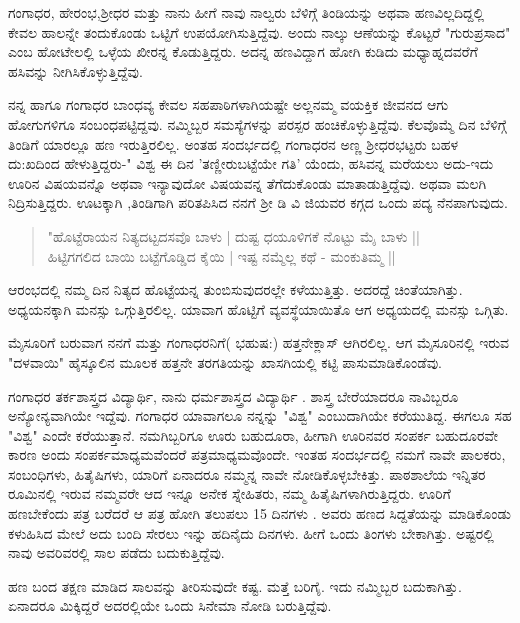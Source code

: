 ಗಂಗಾಧರ, ಹೇರಂಭ,ಶ್ರೀಧರ ಮತ್ತು ನಾನು ಹೀಗೆ ನಾವು ನಾಲ್ವರು ಬೆಳಿಗ್ಗೆ ತಿಂಡಿಯನ್ನು ಅಥವಾ ಹಣವಿಲ್ಲದಿದ್ದಲ್ಲಿ ಕೇವಲ   ಹಾಲನ್ನೇ ತಂದುಕೊಂಡು ಒಟ್ಟಿಗೆ ಉಪಯೋಗಿಸುತ್ತಿದ್ದೆವು. ಅಂದು ನಾಲ್ಕು ಆಣೆಯನ್ನು ಕೊಟ್ಟರೆ "ಗುರುಪ್ರಸಾದ" ಎಂಬ ಹೋಟೇಲಲ್ಲಿ  ಒಳ್ಳೆಯ ಖೀರನ್ನ ಕೊಡುತ್ತಿದ್ದರು. ಅದನ್ನ ಹಣವಿದ್ದಾಗ ಹೋಗಿ ಕುಡಿದು ಮಧ್ಯಾಹ್ನದವರೆಗೆ ಹಸಿವನ್ನು ನೀಗಿಸಿಕೊಳ್ಳುತ್ತಿದ್ದೆವು. 

ನನ್ನ ಹಾಗೂ ಗಂಗಾಧರ ಬಾಂಧವ್ಯ ಕೇವಲ ಸಹಪಾಠಿಗಳಾಗಿಯಷ್ಟೇ ಅಲ್ಲನಮ್ಮ ವಯಕ್ತಿಕ ಜೀವನದ ಆಗು ಹೋಗುಗಳಿಗೂ  ಸಂಬಂಧಪಟ್ಟಿದ್ದವು. ನಮ್ಮಿಬ್ಬರ ಸಮಸ್ಯೆಗಳನ್ನು ಪರಸ್ಪರ ಹಂಚಿಕೊಳ್ಳುತ್ತಿದ್ದೆವು. ಕೆಲವೊಮ್ಮೆ ದಿನ ಬೆಳಿಗ್ಗೆ ತಿಂಡಿಗೆ ಯಾರಲ್ಲೂ ಹಣ ಇರುತ್ತಿರಲಿಲ್ಲ. ಅಂತಹ ಸಂದರ್ಭದಲ್ಲಿ ಗಂಗಾಧರನ ಅಣ್ಣ ಶ್ರೀಧರಭಟ್ಟರು ಬಹಳ ದು:ಖದಿಂದ ಹೇಳುತ್ತಿದ್ದರು-" ವಿಶ್ವ ಈ ದಿನ 'ತಣ್ಣೀರುಬಟ್ಟೆಯೇ ಗತಿ' ಯೆಂದು, ಹಸಿವನ್ನ ಮರೆಯಲು ಅದು-ಇದು ಊರಿನ ವಿಷಯವನ್ನೊ ಅಥವಾ ಇನ್ಯಾವುದೋ ವಿಷಯವನ್ನ ತೆಗೆದುಕೊಂಡು ಮಾತಾಡುತ್ತಿದ್ದೆವು. ಅಥವಾ ಮಲಗಿ ನಿದ್ರಿಸುತ್ತಿದ್ದರು. ಊಟಕ್ಕಾಗಿ ,ತಿಂಡಿಗಾಗಿ ಪರಿತಪಿಸಿದ ನನಗೆ ಶ್ರೀ ಡಿ ವಿ ಜಿಯವರ ಕಗ್ಗದ ಒಂದು ಪದ್ಯ ನೆನಪಾಗುವುದು. 

\begin{verse}
"ಹೊಟ್ಟೆರಾಯನ ನಿತ್ಯದಟ್ಟದಸವೊ ಬಾಳು | ದುಷ್ಟ ಧಯೂಳಿಗಕೆ ನೊಟ್ಟು ಮೈ ಬಾಳು || \\
ಹಿಟ್ಟಿಗಗಲಿದ ಬಾಯಿ ಬಟ್ಟೆಗೊಡ್ಡಿದ ಕೈಯಿ | ಇಷ್ಟ ನಮ್ಮೆಲ್ಲ  ಕಥೆ - ಮಂಕುತಿಮ್ಮ  || 
\end{verse}

ಆರಂಭದಲ್ಲಿ ನಮ್ಮ ದಿನ ನಿತ್ಯದ ಹೊಟ್ಟೆಯನ್ನ ತುಂಬಿಸುವುದರಲ್ಲೇ ಕಳೆಯುತ್ತಿತ್ತು. ಅದರದ್ದೆ ಚಿಂತೆಯಾಗಿತ್ತು.  ಅಧ್ಯಯನಕ್ಕಾಗಿ ಮನಸ್ಸು ಒಗ್ಗುತ್ತಿರಲಿಲ್ಲ. ಯಾವಾಗ ಹೊಟ್ಟಿಗೆ  ವ್ಯವಸ್ಥೆಯಾಯಿತೊ ಆಗ ಅಧ್ಯಯದಲ್ಲಿ ಮನಸ್ಸು  ಒಗ್ಗಿತು. 

ಮೈಸೂರಿಗೆ ಬರುವಾಗ ನನಗೆ ಮತ್ತು ಗಂಗಾಧರನಿಗೆ( ಭಹುಷ:) ಹತ್ತನೇಕ್ಲಾಸ್ ಆಗಿರಲಿಲ್ಲ. ಆಗ ಮೈಸೂರಿನಲ್ಲಿ ಇರುವ "ದಳವಾಯಿ" ಹೈಸ್ಕೂಲಿನ ಮೂಲಕ ಹತ್ತನೇ ತರಗತಿಯನ್ನು ಖಾಸಗಿಯಲ್ಲಿ ಕಟ್ಟಿ ಪಾಸುಮಾಡಿಕೊಂಡೆವು. 

ಗಂಗಾಧರ ತರ್ಕಶಾಸ್ತ್ರದ ವಿದ್ಯಾರ್ಥಿ, ನಾನು ಧರ್ಮಶಾಸ್ತ್ರದ ವಿದ್ಯಾರ್ಥಿ . ಶಾಸ್ತ್ರ ಬೇರೆಯಾದರೂ ನಾವಿಬ್ಬರೂ ಅನ್ಯೋನ್ಯವಾಗಿಯೇ ಇದ್ದೆವು. ಗಂಗಾಧರ ಯಾವಾಗಲೂ ನನ್ನನ್ನು "ವಿಶ್ವ" ಎಂಬುದಾಗಿಯೇ ಕರೆಯುತಿದ್ದ. ಈಗಲೂ ಸಹ "ವಿಶ್ವ" ಎಂದೇ ಕರೆಯುತ್ತಾನೆ. ನಮಗಿಬ್ಬರಿಗೂ ಊರು ಬಹುದೂರಾ, ಹೀಗಾಗಿ ಊರಿನವರ ಸಂಪರ್ಕ ಬಹುದೂರವೇ ಕಾರಣ ಅಂದು  ಸಂಪರ್ಕಮಾಧ್ಯಮವೆಂದರೆ ಪತ್ರಮಾಧ್ಯಮವೊಂದೇ. ಇಂತಹ ಸಂದರ್ಭದಲ್ಲಿ ನಮಗೆ ನಾವೇ ಪಾಲಕರು, ಸಂಬಂಧಿಗಳು, ಹಿತೈಷಿಗಳು, ಯಾರಿಗೆ ಏನಾದರೂ ನಮ್ಮನ್ನ  ನಾವೇ ನೋಡಿಕೊಳ್ಳಬೇಕಿತ್ತು.  ಪಾಠಶಾಲೆಯ ಇನ್ನಿತರ  ರೂಮಿನಲ್ಲಿ  ಇರುವ ನಮ್ಮವರೇ ಆದ ಇನ್ನೂ ಅನೇಕ ಸ್ನೇಹಿತರು, ನಮ್ಮ ಹಿತೈಷಿಗಳಾಗಿರುತ್ತಿದ್ದರು.  ಊರಿಗೆ ಹಣಬೇಕೆಂದು ಪತ್ರ ಬರೆದರೆ ಆ ಪತ್ರ ಹೋಗಿ ತಲುಪಲು 15 ದಿನಗಳು . ಅವರು ಹಣದ ಸಿದ್ದತೆಯನ್ನು ಮಾಡಿಕೊಂಡು  ಕಳುಹಿಸಿದ ಮೇಲೆ ಅದು ಬಂದಿ ಸೇರಲು ಇನ್ನು ಹದಿನೈದು    ದಿನಗಳು. ಹೀಗೆ ಒಂದು ತಿಂಗಳು ಬೇಕಾಗಿತ್ತು.  ಅಷ್ಟರಲ್ಲಿ ನಾವು ಅವರಿವರಲ್ಲಿ ಸಾಲ ಪಡೆದು ಬದುಕುತ್ತಿದ್ದೆವು. 

ಹಣ ಬಂದ ತಕ್ಷಣ ಮಾಡಿದ ಸಾಲವನ್ನು ತೀರಿಸುವುದೇ ಕಷ್ಟ. ಮತ್ತೆ ಬರಿಗೈ. ಇದು ನಮ್ಮಿಬ್ಬರ ಬದುಕಾಗಿತ್ತು. ಏನಾದರೂ ಮಿಕ್ಕಿದ್ದರೆ ಅದರಲ್ಲಿಯೇ ಒಂದು ಸಿನೇಮಾ ನೋಡಿ ಬರುತ್ತಿದ್ದೆವು. 

